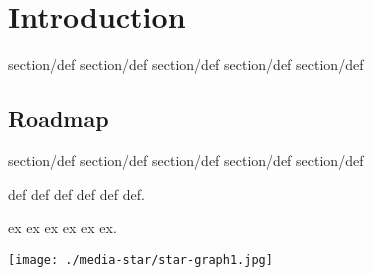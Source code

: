 \chapter{Introduction}
\label{ch:intro}

\begin{definition}
section/def section/def section/def
section/def section/def
\end{definition}

\section{Roadmap}
\label{sec:roadmap}

\begin{definition}
\label{def:one}
section/def section/def section/def
section/def section/def
\end{definition}

\begin{group}
  
\begin{definition}
\label{def:title}
  def def def
  def
  def def.
\end{definition}

\begin{example}
\label{ex:title}
  ex ex ex
  ex
  ex ex.
  \begin{center}
  \texttt{[image: ./media-star/star-graph1.jpg]}
  \end{center}
\end{example}
\end{group}

